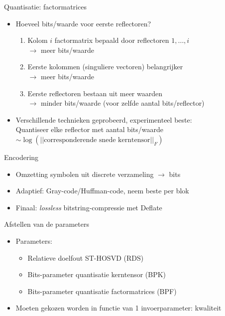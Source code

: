 \documentclass[t,12pt,dutch
\ifx\beamermode\undefined\else,\beamermode\fi
]{beamer}
\begin{document}
\begin{frame}{Quantisatie: factormatrices}
\begin{itemize}
\item Hoeveel bits/waarde voor eerste reflectoren?
\begin{enumerate}
\item Kolom $i$ factormatrix bepaald door reflectoren $1, \dots, i$\\
$\rightarrow$ meer bits/waarde
\item Eerste kolommen (singuliere vectoren) belangrijker\\
$\rightarrow$ meer bits/waarde
\item Eerste reflectoren bestaan uit meer waarden\\
$\rightarrow$ minder bits/waarde (voor zelfde aantal bits/reflector)
\end{enumerate}
\item Verschillende technieken geprobeerd, experimenteel beste:\\
Quantiseer elke reflector met aantal bits/waarde $\sim \log (||\text{corresponderende snede kerntensor}||_F)$
\end{itemize}
\end{frame}

\begin{frame}{Encodering}
\begin{itemize}
\item Omzetting symbolen uit discrete verzameling $\rightarrow$ bits
\item Adaptief: Gray-code/Huffman-code, neem beste per blok
\item Finaal: \textit{lossless} bitstring-compressie met Deflate
\end{itemize}

\end{frame}

\begin{frame}{Afstellen van de parameters}

\begin{itemize}
\item Parameters:
\begin{itemize}
\item Relatieve doelfout ST-HOSVD (RDS)
\item Bits-parameter quantisatie kerntensor (BPK)
\item Bits-parameter quantisatie factormatrices (BPF)
\end{itemize}
\item Moeten gekozen worden in functie van 1 invoerparameter: kwaliteit
\end{itemize}

\end{frame}
\end{document}
